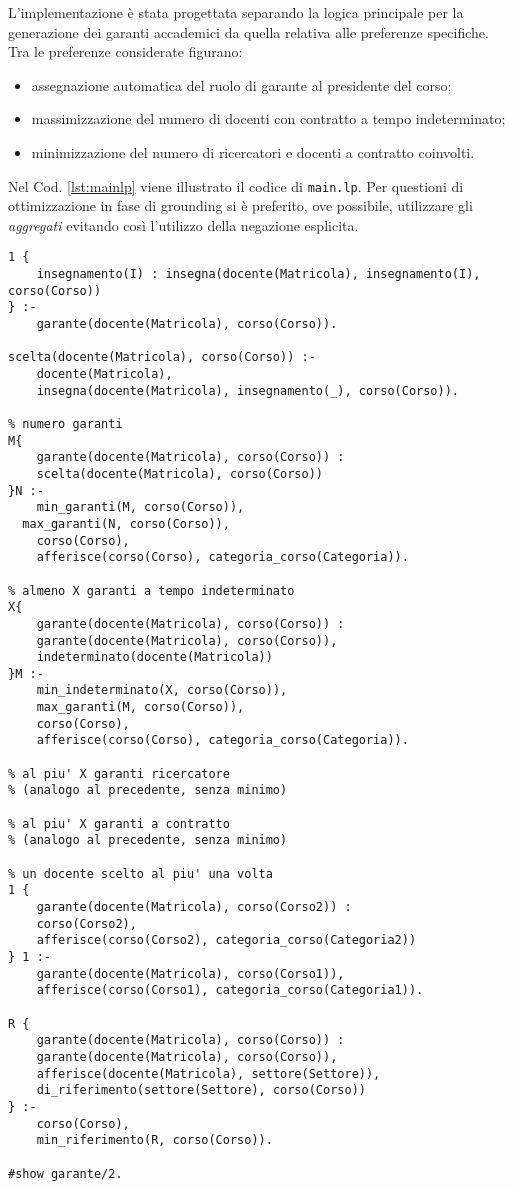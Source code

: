 \documentclass[journal]{IEEEtran}
\begin{document}
L'implementazione è stata progettata separando la logica principale per la
generazione dei garanti accademici da quella relativa alle preferenze
specifiche. Tra le preferenze considerate figurano:  
\begin{itemize}
	\item assegnazione automatica del ruolo di garante al presidente del corso;
	\item massimizzazione del numero di docenti con contratto a tempo indeterminato;
	\item minimizzazione del numero di ricercatori e docenti a contratto coinvolti.
\end{itemize}

Nel Cod. \ref{lst:mainlp} viene illustrato il codice di \texttt{main.lp}. Per
questioni di ottimizzazione in fase di grounding si è preferito, ove possibile, utilizzare gli
\textit{aggregati} evitando così l'utilizzo della negazione esplicita.

\begin{center}
\begin{lstlisting}[style=asp, caption={Codice ASP del file \texttt{main.lp}.}, label={lst:mainlp}]
% se garante allora insegna almeno una materia
1 {
    insegnamento(I) : insegna(docente(Matricola), insegnamento(I), corso(Corso))
} :-
    garante(docente(Matricola), corso(Corso)).

scelta(docente(Matricola), corso(Corso)) :-
	docente(Matricola),
	insegna(docente(Matricola), insegnamento(_), corso(Corso)).

% numero garanti
M{
	garante(docente(Matricola), corso(Corso)) :
	scelta(docente(Matricola), corso(Corso))
}N :-
	min_garanti(M, corso(Corso)),
  max_garanti(N, corso(Corso)),
	corso(Corso),
	afferisce(corso(Corso), categoria_corso(Categoria)).

% almeno X garanti a tempo indeterminato
X{
	garante(docente(Matricola), corso(Corso)) :
	garante(docente(Matricola), corso(Corso)),
	indeterminato(docente(Matricola))
}M :-
	min_indeterminato(X, corso(Corso)),
	max_garanti(M, corso(Corso)),
	corso(Corso),
	afferisce(corso(Corso), categoria_corso(Categoria)).

% al piu' X garanti ricercatore
% (analogo al precedente, senza minimo)

% al piu' X garanti a contratto
% (analogo al precedente, senza minimo)

% un docente scelto al piu' una volta
1 {
    garante(docente(Matricola), corso(Corso2)) :
    corso(Corso2),
    afferisce(corso(Corso2), categoria_corso(Categoria2))
} 1 :-
    garante(docente(Matricola), corso(Corso1)),
    afferisce(corso(Corso1), categoria_corso(Categoria1)).

R {
    garante(docente(Matricola), corso(Corso)) :
    garante(docente(Matricola), corso(Corso)),
    afferisce(docente(Matricola), settore(Settore)),
    di_riferimento(settore(Settore), corso(Corso))
} :-
    corso(Corso),
    min_riferimento(R, corso(Corso)).

#show garante/2.
\end{lstlisting}
\end{center}
\end{document}
